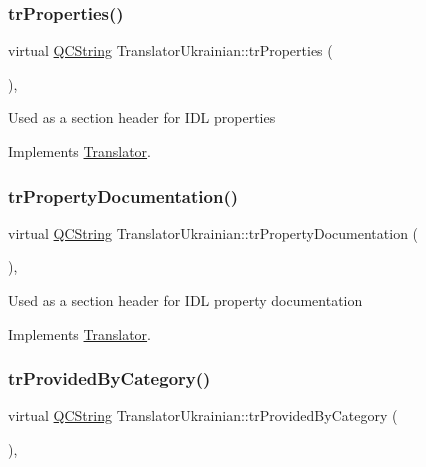 \subsubsection{\texorpdfstring{trProperties()}{trProperties()}}
{\footnotesize\ttfamily virtual \mbox{\hyperlink{class_q_c_string}{Q\+C\+String}} Translator\+Ukrainian\+::tr\+Properties (\begin{DoxyParamCaption}{ }\end{DoxyParamCaption})\hspace{0.3cm}{\ttfamily [inline]}, {\ttfamily [virtual]}}

Used as a section header for I\+DL properties 

Implements \mbox{\hyperlink{class_translator}{Translator}}.

\mbox{\label{class_translator_ukrainian_ace8242e7557bb33a8036ea5ed7f9a2f3}} 
\subsubsection{\texorpdfstring{trPropertyDocumentation()}{trPropertyDocumentation()}}
{\footnotesize\ttfamily virtual \mbox{\hyperlink{class_q_c_string}{Q\+C\+String}} Translator\+Ukrainian\+::tr\+Property\+Documentation (\begin{DoxyParamCaption}{ }\end{DoxyParamCaption})\hspace{0.3cm}{\ttfamily [inline]}, {\ttfamily [virtual]}}

Used as a section header for I\+DL property documentation 

Implements \mbox{\hyperlink{class_translator}{Translator}}.

\mbox{\label{class_translator_ukrainian_abdfb29338a413be33c4ca735d8706a79}} 
\subsubsection{\texorpdfstring{trProvidedByCategory()}{trProvidedByCategory()}}
{\footnotesize\ttfamily virtual \mbox{\hyperlink{class_q_c_string}{Q\+C\+String}} Translator\+Ukrainian\+::tr\+Provided\+By\+Category (\begin{DoxyParamCaption}{ }\end{DoxyParamCaption})\hspace{0.3cm}{\ttfamily [inline]}, {\ttfamily [virtual]}}

